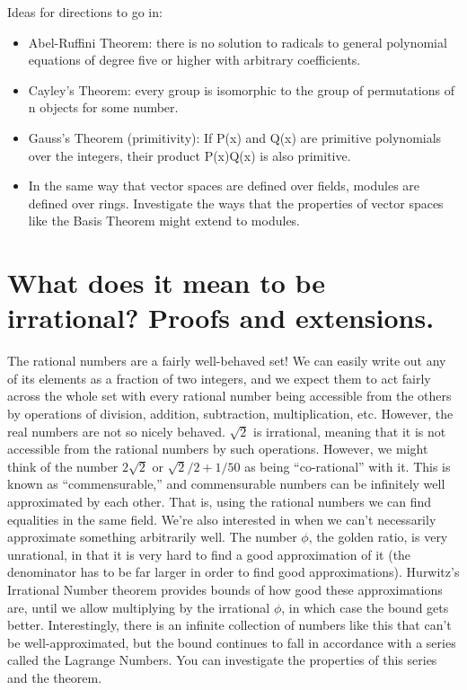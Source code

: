 \documentclass{article}
\begin{document}
    Ideas for directions to go in:
    \begin{itemize}
        \item Abel-Ruffini Theorem: there is no solution to radicals to general polynomial equations of degree five or higher with arbitrary coefficients. 
        \item Cayley's Theorem: every group is isomorphic to the group of permutations of n objects for some number.
        \item Gauss's Theorem (primitivity): If P(x) and Q(x) are primitive polynomials over the integers, their product P(x)Q(x) is also primitive.
        \item In the same way that vector spaces are defined over fields, modules are defined over rings. Investigate the ways that the properties of vector spaces like the Basis Theorem might extend to modules.
    \end{itemize}

\section{What does it mean to be irrational? Proofs and extensions.}

        The rational numbers are a fairly well-behaved set!
        We can easily write out any of its elements as a fraction of two integers, and we expect them to act fairly across the whole set with every rational number being accessible from the others by operations of division, addition, subtraction, multiplication, etc.
        However, the real numbers are not so nicely behaved. $\sqrt 2$ is irrational, meaning that it is not accessible from the rational numbers by such operations.
        However, we might think of the number $2\sqrt2$ or $\sqrt2/2+1/50$ as being ``co-rational'' with it.
        This is known as ``commensurable,'' and commensurable numbers can be infinitely well approximated by each other. That is, using the rational numbers we can find equalities in the same field. We're also interested in when we can't necessarily approximate something arbitrarily well. The number $\phi$, the golden ratio, is very unrational, in that it is very hard to find a good approximation of it (the denominator has to be far larger in order to find good approximations). Hurwitz's Irrational Number theorem provides bounds of how good these approximations are, until we allow multiplying by the irrational $\phi$, in which case the bound gets better. Interestingly, there is an infinite collection of numbers like this that can't be well-approximated, but the bound continues to fall in accordance with a series called the Lagrange Numbers. You can investigate the properties of this series and the theorem.
\end{document}
